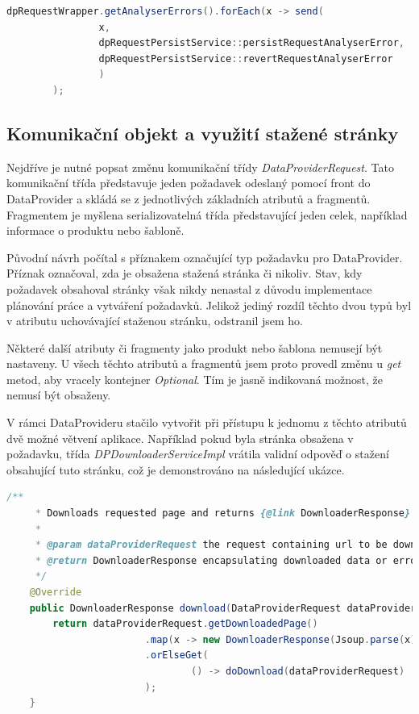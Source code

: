 \documentclass[thesis=B,czech]{FITthesis}[2012/06/26]
\begin{document}
\par

\begin{lstlisting}[language=Java, caption={Příklad zavolání metody odesílající požadavky.}]
        dpRequestWrapper.getAnalyserErrors().forEach(x -> send(
                x,
                dpRequestPersistService::persistRequestAnalyserError,
                dpRequestPersistService::revertRequestAnalyserError
                )
        );
\end{lstlisting}

\subsection{Komunikační objekt a využití stažené stránky}
Nejdříve je nutné popsat změnu komunikační třídy \textit{DataProviderRequest}. Tato komunikační třída představuje jeden požadavek odeslaný pomocí front do DataProvider a skládá se z jednotlivých základních atributů a fragmentů.
Fragmentem je myšlena serializovatelná třída představující jeden celek, například informace o produktu nebo šabloně.
\par
Původní návrh počítal s příznakem označující typ požadavku pro DataProvider. Příznak označoval, zda je obsažena stažená stránka či nikoliv. Stav, kdy požadavek obsahoval stránky však nikdy nenastal z důvodu implementace plánování práce a vytváření požadavků. Jelikož jediný rozdíl těchto dvou typů byl v atributu uchovávající staženou stránku, odstranil jsem ho.
\par
Některé další atributy či fragmenty jako produkt nebo šablona nemusejí být nastaveny. U všech těchto atributů a fragmentů jsem proto provedl změnu u \textit{get} metod, aby vracely kontejner \textit{Optional}. Tím je jasně indikovaná možnost, že nemusí být obsaženy.
\par
V rámci DataProvideru stačilo vytvořit při přístupu k jednomu z těchto atributů dvě možné větvení aplikace.
Například pokud byla stránka obsažena v požadavku, třída \textit{DPDownloaderServiceImpl} vrátila validní odpověď o stažení obsahující tuto stránku, což je demonstrováno na následující ukázce.

\begin{lstlisting}[language=Java, caption={Veřejná metoda třídy \textit{DPDownloaderServiceImpl} zajišťující stažení stránky obsahující detail produktu.}]
    /**
     * Downloads requested page and returns {@link DownloaderResponse} object.
     *
     * @param dataProviderRequest the request containing url to be downloaded
     * @return DownloaderResponse encapsulating downloaded data or error
     */
    @Override
    public DownloaderResponse download(DataProviderRequest dataProviderRequest) {
        return dataProviderRequest.getDownloadedPage()
                        .map(x -> new DownloaderResponse(Jsoup.parse(x)))
                        .orElseGet(
                                () -> doDownload(dataProviderRequest)
                        );
    }
\end{lstlisting}
\end{document}
